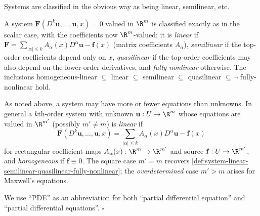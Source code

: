 Systems are classified in the obvious way as being linear, semilinear, etc.

\begin{definition}
\label{def:system-linear-semilinear-quasilinear-fully-nonlinear}
\leanok
A system $\mathbf{F}(D^k\mathbf{u}, \ldots, \mathbf{u}, x) = 0$ valued in $\R^m$ is classified exactly as in the scalar case, with the coefficients now $\R^m$-valued: it is \emph{linear} if $\mathbf{F} = \sum_{|\alpha|\le k} A_\alpha(x) D^\alpha\mathbf{u} - \mathbf{f}(x)$ (matrix coefficients $A_\alpha$), \emph{semilinear} if the top-order coefficients depend only on $x$, \emph{quasilinear} if the top-order coefficients may also depend on the lower-order derivatives, and \emph{fully nonlinear} otherwise. The inclusions homogeneous-linear $\subseteq$ linear $\subseteq$ semilinear $\subseteq$ quasilinear $\subseteq \neg$ fully-nonlinear hold.
\end{definition}

\begin{definition}
\label{def:non-square-linear-system}
\leanok
As noted above, a system may have more or fewer equations than unknowns. In general a $k$th-order system with unknown $\mathbf{u} : U \to \R^{m}$ whose equations are valued in $\R^{m'}$ (possibly $m' \neq m$) is \emph{linear} if
$$\mathbf{F}(D^k\mathbf{u}, \ldots, \mathbf{u}, x) = \sum_{|\alpha|\le k} A_\alpha(x) D^\alpha\mathbf{u} - \mathbf{f}(x)$$
for rectangular coefficient maps $A_\alpha(x) : \R^{m} \to \R^{m'}$ and source $\mathbf{f} : U \to \R^{m'}$, and \emph{homogeneous} if $\mathbf{f} \equiv 0$. The square case $m' = m$ recovers \cref{def:system-linear-semilinear-quasilinear-fully-nonlinear}; the \emph{overdetermined} case $m' > m$ arises for Maxwell's equations.
\end{definition}

\begin{remark}
\label{rem:pde-abbreviation}
We use ``PDE'' as an abbreviation for both ``partial differential equation'' and ``partial differential equations''. $\square$
\end{remark}

